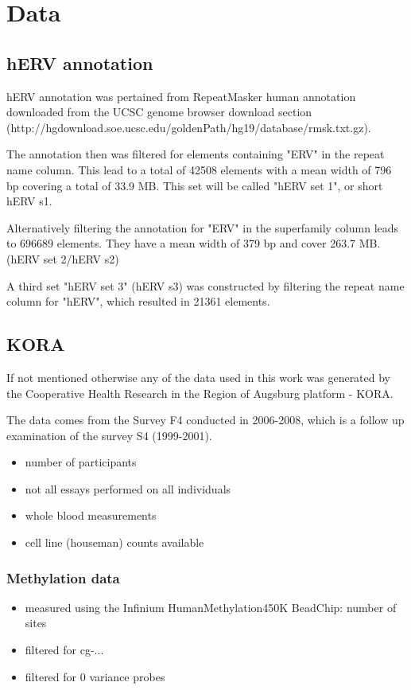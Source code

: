 \documentclass[a4paper,12pt]{article}
\begin{document}
\newpage
\section{Data}


\subsection{hERV annotation}
hERV annotation was pertained from RepeatMasker human annotation downloaded from the UCSC genome browser download section \\(http://hgdownload.soe.ucsc.edu/goldenPath/hg19/database/rmsk.txt.gz).
 
The annotation then was filtered for elements containing "ERV" in the repeat name column. This lead to a total of 42508 elements with a mean width of 796 bp covering a total of 33.9 MB. This set will be called "hERV set 1", or short hERV s1.

Alternatively filtering the annotation for "ERV" in the superfamily column leads to 696689 elements. They have a mean width of 379 bp and cover 263.7 MB. (hERV set 2/hERV s2)

A third set "hERV set 3" (hERV s3) was constructed by filtering the repeat name column for "hERV", which resulted in 21361 elements. 

\subsection{KORA}
If not mentioned otherwise any of the data used in this work was generated by the Cooperative Health Research in the Region of Augsburg platform - KORA. 

The data comes from the Survey F4 conducted in 2006-2008, which is a follow up examination of the survey S4 (1999-2001). 

\begin{itemize}
\item number of participants
\item not all essays performed on all individuals
\item whole blood measurements
\item cell line (houseman) counts available
\end{itemize}

\subsubsection{Methylation data}
\begin{itemize}
\item measured using the Infinium HumanMethylation450K BeadChip: number of sites
\item filtered for cg-...
\item filtered for 0 variance probes
\end{itemize}
\end{document}
